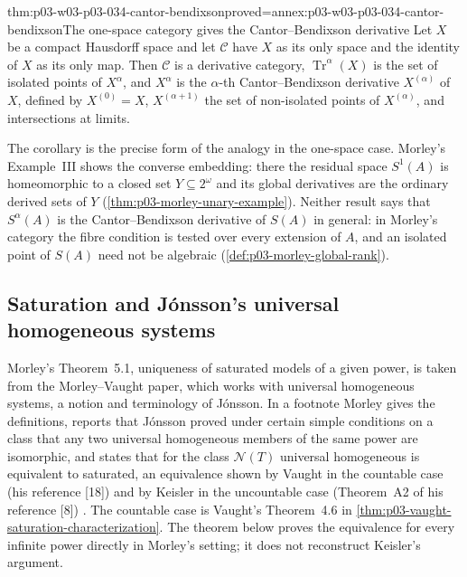 \begin{hbcorollary}{thm:p03-w03-p03-034-cantor-bendixson}{proved=annex:p03-w03-p03-034-cantor-bendixson}{The one-space category gives the Cantor--Bendixson derivative}
Let \(X\) be a compact Hausdorff space and let \(\mathcal C\) have \(X\)
as its only space and the identity of \(X\) as its only map. Then
\(\mathcal C\) is a derivative category, \(\operatorname{Tr}^\alpha(X)\)
is the set of isolated points of \(X^\alpha\), and \(X^\alpha\) is the
\(\alpha\)-th Cantor--Bendixson derivative \(X^{(\alpha)}\) of \(X\),
defined by \(X^{(0)}=X\), \(X^{(\alpha+1)}\) the set of non-isolated
points of \(X^{(\alpha)}\), and intersections at limits.
\end{hbcorollary}

The corollary is the precise form of the analogy in the one-space case.
Morley's Example~III shows the converse embedding: there the residual space
\(S^1(A)\) is homeomorphic to a closed set \(Y\subseteq2^\omega\) and its
global derivatives are the ordinary derived sets of \(Y\)
(\cref{thm:p03-morley-unary-example}). Neither result says that
\(S^\alpha(A)\) is the Cantor--Bendixson derivative of \(S(A)\) in general:
in Morley's category the fibre condition is tested over every extension of
\(A\), and an isolated point of \(S(A)\) need not be algebraic
(\cref{def:p03-morley-global-rank}).

\subsection{Saturation and Jónsson's universal homogeneous systems}
\label{sec:p03-w03-p03-034-universal-homogeneous}

Morley's Theorem~5.1, uniqueness of saturated models of a given power, is
taken from the Morley--Vaught paper, which works with universal homogeneous
systems, a notion and terminology of Jónsson. In a footnote Morley gives the
definitions, reports that Jónsson proved under certain simple conditions on
a class that any two universal homogeneous members of the same power are
isomorphic, and states that for the class \(\mathcal N(T)\) universal
homogeneous is equivalent to saturated, an equivalence shown by Vaught in
the countable case (his reference [18]) and by Keisler in the uncountable
case (Theorem~A2 of his reference [8]) \cite[p.~535, n.~22]{Morley1965}.
The countable case is Vaught's Theorem~4.6 in
\cref{thm:p03-vaught-saturation-characterization}. The theorem below proves
the equivalence for every infinite power directly in Morley's setting; it
does not reconstruct Keisler's argument.

